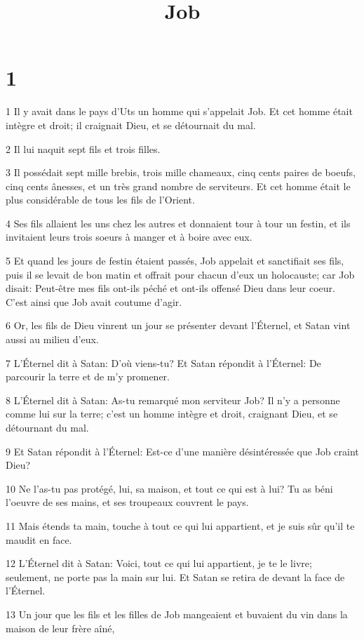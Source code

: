 

\title{Job}


\chapter{1}

\par 1 Il y avait dans le pays d'Uts un homme qui s'appelait Job. Et cet homme était intègre et droit; il craignait Dieu, et se détournait du mal.
\par 2 Il lui naquit sept fils et trois filles.
\par 3 Il possédait sept mille brebis, trois mille chameaux, cinq cents paires de boeufs, cinq cents ânesses, et un très grand nombre de serviteurs. Et cet homme était le plus considérable de tous les fils de l'Orient.
\par 4 Ses fils allaient les uns chez les autres et donnaient tour à tour un festin, et ils invitaient leurs trois soeurs à manger et à boire avec eux.
\par 5 Et quand les jours de festin étaient passés, Job appelait et sanctifiait ses fils, puis il se levait de bon matin et offrait pour chacun d'eux un holocauste; car Job disait: Peut-être mes fils ont-ils péché et ont-ils offensé Dieu dans leur coeur. C'est ainsi que Job avait coutume d'agir.
\par 6 Or, les fils de Dieu vinrent un jour se présenter devant l'Éternel, et Satan vint aussi au milieu d'eux.
\par 7 L'Éternel dit à Satan: D'où viens-tu? Et Satan répondit à l'Éternel: De parcourir la terre et de m'y promener.
\par 8 L'Éternel dit à Satan: As-tu remarqué mon serviteur Job? Il n'y a personne comme lui sur la terre; c'est un homme intègre et droit, craignant Dieu, et se détournant du mal.
\par 9 Et Satan répondit à l'Éternel: Est-ce d'une manière désintéressée que Job craint Dieu?
\par 10 Ne l'as-tu pas protégé, lui, sa maison, et tout ce qui est à lui? Tu as béni l'oeuvre de ses mains, et ses troupeaux couvrent le pays.
\par 11 Mais étends ta main, touche à tout ce qui lui appartient, et je suis sûr qu'il te maudit en face.
\par 12 L'Éternel dit à Satan: Voici, tout ce qui lui appartient, je te le livre; seulement, ne porte pas la main sur lui. Et Satan se retira de devant la face de l'Éternel.
\par 13 Un jour que les fils et les filles de Job mangeaient et buvaient du vin dans la maison de leur frère aîné,
